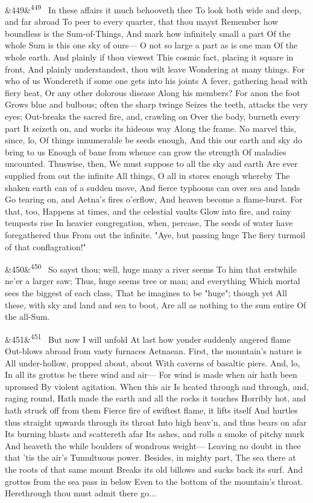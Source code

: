 \documentclass[12pt]{article}
\newcommand{\para}[1][]{\par\noindent\ifx&#1&\else\textsuperscript{\footnotesize #1}~\fi}
\begin{document}
\para[449] In these affairs it much behooveth thee To look both wide and deep, and far abroad To peer to every quarter, that thou mayst Remember how boundless is the Sum-of-Things, And mark how infinitely small a part Of the whole Sum is this one sky of ours--- O not so large a part as is one man Of the whole earth. And plainly if thou viewest This cosmic fact, placing it square in front, And plainly understandest, thou wilt leave Wondering at many things. For who of us Wondereth if some one gets into his joints A fever, gathering head with fiery heat, Or any other dolorous disease Along his members? For anon the foot Grows blue and bulbous; often the sharp twinge Seizes the teeth, attacks the very eyes; Out-breaks the sacred fire, and, crawling on Over the body, burneth every part It seizeth on, and works its hideous way Along the frame. No marvel this, since, lo, Of things innumerable be seeds enough, And this our earth and sky do bring to us Enough of bane from whence can grow the strength Of maladies uncounted. Thuswise, then, We must suppose to all the sky and earth Are ever supplied from out the infinite All things, O all in stores enough whereby The shaken earth can of a sudden move, And fierce typhoons can over sea and lands Go tearing on, and Aetna's fires o'erflow, And heaven become a flame-burst. For that, too, Happens at times, and the celestial vaults Glow into fire, and rainy tempests rise In heavier congregation, when, percase, The seeds of water have foregathered thus From out the infinite. "Aye, but passing huge The fiery turmoil of that conflagration!"

\para[450] So sayst thou; well, huge many a river seems To him that erstwhile ne'er a larger saw; Thus, huge seems tree or man; and everything Which mortal sees the biggest of each class, That he imagines to be "huge"; though yet All these, with sky and land and sea to boot, Are all as nothing to the sum entire Of the all-Sum.

\para[451] But now I will unfold At last how yonder suddenly angered flame Out-blows abroad from vasty furnaces Aetnaean. First, the mountain's nature is All under-hollow, propped about, about With caverns of basaltic piers. And, lo, In all its grottos be there wind and air--- For wind is made when air hath been uproused By violent agitation. When this air Is heated through and through, and, raging round, Hath made the earth and all the rocks it touches Horribly hot, and hath struck off from them Fierce fire of swiftest flame, it lifts itself And hurtles thus straight upwards through its throat Into high heav'n, and thus bears on afar Its burning blasts and scattereth afar Its ashes, and rolls a smoke of pitchy murk And heaveth the while boulders of wondrous weight--- Leaving no doubt in thee that 'tis the air's Tumultuous power. Besides, in mighty part, The sea there at the roots of that same mount Breaks its old billows and sucks back its surf. And grottos from the sea pass in below Even to the bottom of the mountain's throat. Herethrough thou must admit there go...
\end{document}
